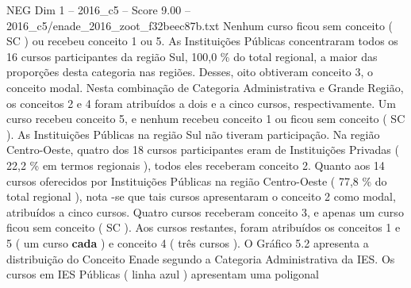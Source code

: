 \begin{textsample}{NEG Dim 1 – 2016\_c5 – Score 9.00 – 2016\_c5/enade\_2016\_zoot\_f32beec87b.txt}
Nenhum curso ficou sem conceito ( SC ) ou recebeu conceito 1 ou 5.
As Instituições Públicas concentraram todos os 16 cursos participantes da região Sul, 100,0 \% do total regional, a maior das proporções desta categoria nas regiões.
Desses, oito obtiveram conceito 3, o conceito modal.
Nesta combinação de Categoria Administrativa e Grande Região, os conceitos 2 e 4 foram atribuídos a dois e a cinco cursos, respectivamente.
Um curso recebeu conceito 5, e nenhum recebeu conceito 1 ou ficou sem conceito ( SC ).
As Instituições Públicas na região Sul não tiveram participação.
Na região Centro-Oeste, quatro dos 18 cursos participantes eram de Instituições Privadas ( 22,2 \% em termos regionais ), todos eles receberam conceito 2.
Quanto aos 14 cursos oferecidos por Instituições Públicas na região Centro-Oeste ( 77,8 \% do total regional ), nota -se que tais cursos apresentaram o conceito 2 como modal, atribuídos a cinco cursos.
Quatro cursos receberam conceito 3, e apenas um curso ficou sem conceito ( SC ).
Aos cursos restantes, foram atribuídos os conceitos 1 e 5 ( um curso \textbf{cada} ) e conceito 4 ( três cursos ).
O Gráfico 5.2 apresenta a distribuição do Conceito Enade segundo a Categoria Administrativa da IES.
Os cursos em IES Públicas ( linha azul ) apresentam uma poligonal

\end{textsample}
